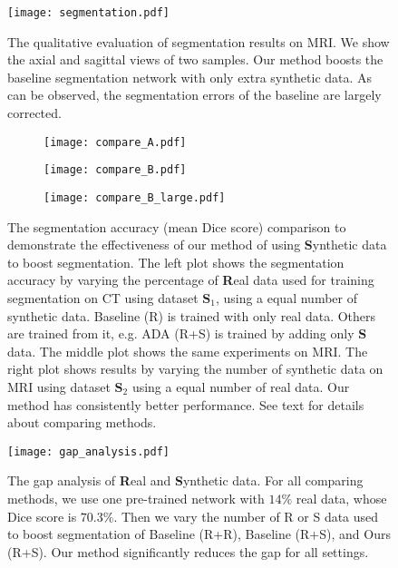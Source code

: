 \documentclass[10pt,twocolumn,letterpaper]{article}
\begin{document}
\begin{figure}[t]
	\begin{center}
		\texttt{[image: segmentation.pdf]}
	\end{center}
	\vspace{-.2cm}
	\caption{The qualitative evaluation of segmentation results on MRI. We show the axial and sagittal views of two samples. Our method boosts the baseline segmentation network with only extra synthetic data. As can be observed, the segmentation errors of the baseline are largely corrected. } \label{fig:segmentation}
\end{figure}
\begin{figure*}[t]	
	\begin{center}
		\begin{subfigure}[b]{0.33\textwidth}
			\centering
			\texttt{[image: compare\_A.pdf]}
		\end{subfigure}
		\begin{subfigure}[b]{0.33\textwidth}
			\centering
			\texttt{[image: compare\_B.pdf]}
		\end{subfigure}
		\begin{subfigure}[b]{0.33\textwidth}
			\centering
			\texttt{[image: compare\_B\_large.pdf]}
		\end{subfigure}
		
	\end{center}
	\vspace{-.4cm}
	\caption{The segmentation accuracy (mean Dice score) comparison to demonstrate the effectiveness of our method of using \textbf{S}ynthetic data to boost segmentation. The left plot shows the segmentation accuracy by varying the percentage of \textbf{R}eal data used for training segmentation on CT using dataset $\mathbf{S}_1$, using a equal number of synthetic data. Baseline (R) is trained with only real data. Others are trained from it, e.g. ADA (R+S) is trained by adding only \textbf{S} data. The middle plot shows the same experiments on MRI. The right plot shows results by varying the number of synthetic data on MRI using dataset $\mathbf{S}_2$ using a equal number of real data. Our method has consistently better performance. See text for details about comparing methods. \vspace{-.4cm}} \label{fig:seg_eval} 
\end{figure*}


\begin{figure}[t]
	\begin{center}
		\texttt{[image: gap\_analysis.pdf]}
	\end{center}
	\vspace{-.4cm}
	\caption{The gap analysis of \textbf{R}eal and \textbf{S}ynthetic data. For all comparing methods, we use one pre-trained network with $14\%$ real data, whose Dice score is $70.3\%$. Then we vary the number of R or S data used to boost segmentation of Baseline (R+R),  Baseline (R+S), and Ours (R+S).  Our method significantly reduces the gap for all settings.} \label{fig:gap} 
\end{figure}
\end{document}
